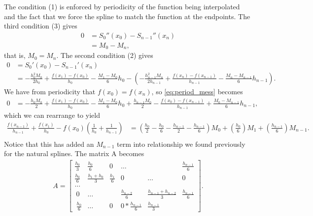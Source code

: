 \documentclass[10pt]{article}
\begin{document}
\begin{enumerate}
    The condition (1) is enforced by periodicity of the function being interpolated and the fact that we force the spline to match the function at the endpoints. The third condition (3) gives \begin{align*}
        0 &= S_0''(x_0) - S_{n-1}''(x_n) \\
          &= M_0 - M_n,
    \end{align*} that is, \(M_0 = M_n\). The second condition (2) gives \begin{align}
      0 &= S_0'(x_0) - S_{n-1}'(x_n) \nonumber \\
        &= -\frac{h_0^2M_0}{2h_0} + \frac{f(x_1) - f(x_0)}{h_0} - \frac{M_1 - M_0}{6}h_0 - \left( -\frac{h_{n-1}^2M_n}{2h_{n-1}} + \frac{f(x_n) - f(x_{n-1})}{h_{n-1}} - \frac{M_n - M_{n-1}}{6}h_{n-1} \right) \label{eq:period_mess}.
    \end{align} We have from periodicity that \(f(x_0) = f(x_n)\), so \eqref{eq:period_mess} becomes \begin{align*}
        0 &= -\frac{h_0M_0}{2} + \frac{f(x_1) - f(x_0)}{h_0} - \frac{M_1 - M_0}{6}h_0 + \frac{h_{n-1}M_0}{2} - \frac{f(x_0) - f(x_{n-1})}{h_{n-1}} + \frac{M_0 - M_{n-1}}{6}h_{n-1},
    \end{align*} which we can rearrange to yield \begin{align*}
        \frac{f(x_{n-1})}{h_{n-1}} + \frac{f(x_1)}{h_0} - f(x_0) \left( \frac{1}{h_0} + \frac{1}{h_{n-1}} \right) &= \left(\frac{h_0}{2} - \frac{h_0}{6} - \frac{h_{n-1}}{2} - \frac{h_{n-1}}{6}\right)M_0 + \left( \frac{h_0}{6} \right)M_1 + \left( \frac{h_{n-1}}{6} \right)M_{n-1}. \\
    \end{align*}
    Notice that this has added an $M_{n-1}$ term into relationship we found previously for the natural splines. The matrix A becomes \begin{align*}
        A = \begin{bmatrix}
            \frac{h_0}{3} & \frac{h_0}{6} & 0 & \dots & & \frac{h_{n-1}}{6} \\
            \frac{h_0}{6} & \frac{h_1+h_0}{3} & \frac{h_1}{6} & 0 & \dots & 0 \\
            \dots & \\\
            0 & \dots  & &\frac{h_{n-2}}{6} & \frac{h_{n-1} + h_{n-2}}3 & \frac{h_{n-1}}{6} \\\
            \frac{h_0}{6} & \dots  & 0 & 0 * \frac{h_{n-1}}{6} & \frac{h_{n-1}}{3}
        \end{bmatrix}.
    \end{align*} 


\end{enumerate}
\newpage
{\small }
\end{document}
